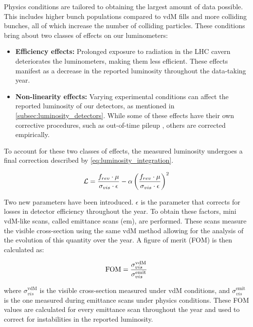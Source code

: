 Physics conditions are tailored to obtaining the largest amount of data possible. This includes higher bunch populations compared to vdM fills and more colliding bunches, all of which increase the number of colliding particles. These conditions bring about two classes of effects on our luminometers:

\begin{itemize}
    \item \textbf{Efficiency effects:} Prolonged exposure to radiation in the LHC cavern deteriorates the luminometers, making them less efficient. These effects manifest as a decrease in the reported luminosity throughout the data-taking year.
    \item \textbf{Non-linearity effects:} Varying experimental conditions can affect the reported luminosity of our detectors, as mentioned in \autoref{subsec:luminosity_detectors}. While some of these effects have their own corrective procedures, such as out-of-time pileup \cite{Sirunyan:2759951}, others are corrected empirically.
\end{itemize}

To account for these two classes of effects, the measured luminosity undergoes a final correction described by \autoref{eq:luminosity_integration}.

\begin{equation}
    \centering
    \mathcal{L} = \frac{f_{rev} \cdot \mu}{\sigma_{vis} \cdot \epsilon} - \alpha \left( \frac{f_{rev} \cdot \mu}{\sigma_{vis} \cdot \epsilon} \right)^{2}
    \label{eq:luminosity_integration}
\end{equation}

Two new parameters have been introduced. \(\epsilon\) is the parameter that corrects for losses in detector efficiency throughout the year. To obtain these factors, mini vdM-like scans, called emittance scans (em), are performed. These scans measure the visible cross-section using the same vdM method allowing for the analysis of the evolution of this quantity over the year. A figure of merit (FOM) is then calculated as:

\begin{equation}
    \centering
    \text{FOM} = \frac{\sigma^{\text{vdM}}_{vis}}{\sigma^{\text{emit}}_{vis}}
    \label{eq:figure_of_merit}
\end{equation}

where \(\sigma^{\text{vdM}}_{vis}\) is the visible cross-section measured under vdM conditions, and \(\sigma^{\text{emit}}_{vis}\) is the one measured during emittance scans under physics conditions. These FOM values are calculated for every emittance scan throughout the year and used to correct for instabilities in the reported luminosity.

